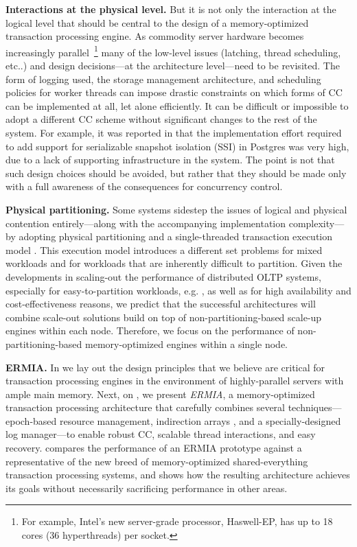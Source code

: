 \vspace{2mm}
{\bf Interactions at the physical level.} 
But it is not only the interaction at the logical level that should be central to the design of a memory-optimized transaction processing engine. As commodity server hardware becomes increasingly parallel~\footnote{For example, Intel's new server-grade processor, Haswell-EP, has up to 18 cores (36 hyperthreads) per socket.} many of the low-level issues (latching, thread scheduling, etc..) and design decisions---at the architecture level---need to be revisited. The form of logging used, the storage management architecture, and scheduling policies for worker threads can impose drastic constraints on which forms of CC can be implemented at all, let alone efficiently. 
It can be difficult or impossible to adopt a different CC scheme without significant changes to the rest of the system. 
For example, it was reported in \cite{PortsG12} that the implementation effort required to add support for serializable snapshot isolation (SSI) in Postgres was very high, due to a lack of supporting infrastructure in the system. 
The point is not that such design choices should be avoided, but rather that they should be made only with a full awareness of the consequences for concurrency control. 

\vspace{2mm}
{\bf Physical partitioning.} Some systems sidestep the issues of logical and physical contention entirely---along with the accompanying implementation complexity---by adopting physical partitioning and a single-threaded transaction execution model \cite{Kallman+08,KemperN11}. This execution model introduces a different set problems for mixed workloads and for workloads that are inherently difficult to partition.  Given the developments in scaling-out the performance of distributed OLTP systems, especially for easy-to-partition workloads, e.g. \cite{Corbett+12,BailisFHGS14,ThomsonA10}, as well as for high availability and cost-effectiveness reasons, we predict that the successful architectures will combine scale-out solutions build on top of non-partitioning-based scale-up engines within each node.
Therefore, we focus on the performance of non-partitioning-based memory-optimized engines within a single node.

\vspace{2mm}
{\bf ERMIA.} 
In  we lay out the design principles that we believe are critical for transaction processing engines in the environment of highly-parallel servers with ample main memory. Next, on , we present {\em ERMIA}, a memory-optimized transaction processing architecture that carefully combines several techniques---epoch-based resource management, indirection arrays \cite{SadoghiRCB13}, and a specially-designed log manager---to enable robust CC, scalable thread interactions, and easy recovery.  
 compares the performance of an ERMIA prototype against a representative of the new breed of memory-optimized shared-everything transaction processing systems, and shows how the resulting architecture achieves its goals without necessarily sacrificing performance in other areas.

